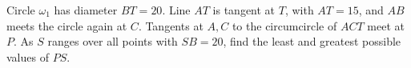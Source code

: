 Circle $\omega_1$ has diameter $BT=20$. Line $AT$ is tangent at $T$, with $AT=15$, and $AB$ meets the circle again at $C$. Tangents at $A,C$ to the circumcircle of $ACT$ meet at $P$. As $S$ ranges over all points with $SB=20$, find the least and greatest possible values of $PS$.
